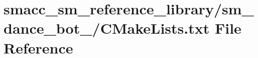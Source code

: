 \hypertarget{sm__reference__library_2sm__dance__bot__3_2CMakeLists_8txt}{}\section{smacc\+\_\+sm\+\_\+reference\+\_\+library/sm\+\_\+dance\+\_\+bot\+\_/\+C\+Make\+Lists.txt File Reference}
\label{sm__reference__library_2sm__dance__bot__3_2CMakeLists_8txt}

